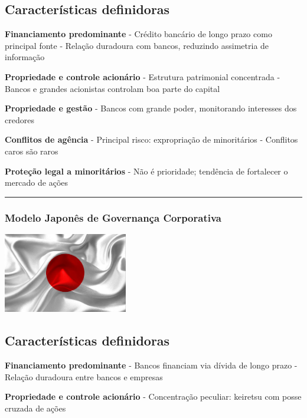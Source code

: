 \documentclass[
]{book}
\begin{document}
\subsection{Características definidoras}\label{caracteruxedsticas-definidoras-1}

\textbf{Financiamento predominante} - Crédito bancário de longo prazo como principal fonte - Relação duradoura com bancos, reduzindo assimetria de informação

\textbf{Propriedade e controle acionário} - Estrutura patrimonial concentrada - Bancos e grandes acionistas controlam boa parte do capital

\textbf{Propriedade e gestão} - Bancos com grande poder, monitorando interesses dos credores

\textbf{Conflitos de agência} - Principal risco: expropriação de minoritários - Conflitos caros são raros

\textbf{Proteção legal a minoritários} - Não é prioridade; tendência de fortalecer o mercado de ações

\begin{center}\rule{0.5\linewidth}{0.5pt}\end{center}

\subsubsection{Modelo Japonês de Governança Corporativa}\label{modelo-japonuxeas-de-governanuxe7a-corporativa}

\includegraphics[width=2.13542in,height=\textheight]{images/02-2025-08-12_13/09-modelo_japones.jpg}

\subsection{Características definidoras}\label{caracteruxedsticas-definidoras-2}

\textbf{Financiamento predominante} - Bancos financiam via dívida de longo prazo - Relação duradoura entre bancos e empresas

\textbf{Propriedade e controle acionário} - Concentração peculiar: keiretsu com posse cruzada de ações
\end{document}
